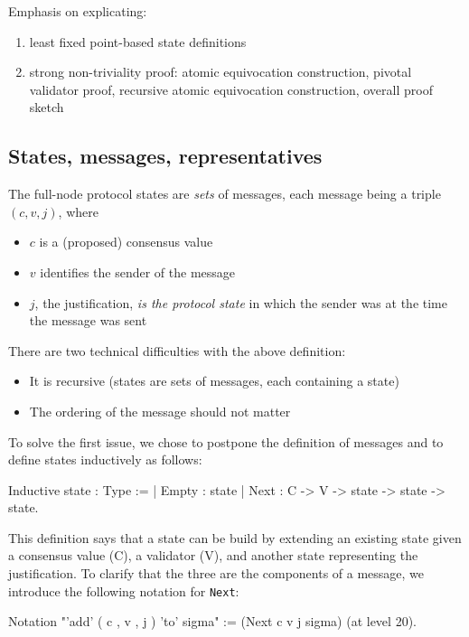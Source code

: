 
Emphasis on explicating: 
\begin{enumerate}
	\item least fixed point-based state definitions
	\item strong non-triviality proof: atomic equivocation construction, pivotal validator proof, recursive atomic equivocation construction, overall proof sketch
\end{enumerate}

\subsection{States, messages, representatives}

The full-node protocol states are {\em sets} of messages, each message being a triple $(c, v, j)$, where
\begin{itemize}
    \item $c$ is a (proposed) consensus value
    \item $v$ identifies the sender of the message
    \item $j$, the justification, {\em is the protocol state} in which the sender was at the time the message was sent
\end{itemize}

There are two technical difficulties with the above definition:  
\begin{itemize}
    \item It is recursive (states are sets of messages, each containing a state)
    \item The ordering of the message should not matter
\end{itemize}

To solve the first issue, we chose to postpone the definition of messages and
to define states inductively as follows:

\begin{coq}
Inductive state : Type :=
  | Empty : state
  | Next : C ->  V -> state -> state -> state.
\end{coq}

This definition says that a state can be build by extending an existing state
given a consensus value (C), a validator (V), and another state representing
the justification.
To clarify that the three are the components of a message, we introduce the
following notation for \verb"Next":

\begin{coq}
Notation "'add' ( c , v , j ) 'to' sigma" :=
  (Next c v j sigma)
  (at level 20).
\end{coq}

